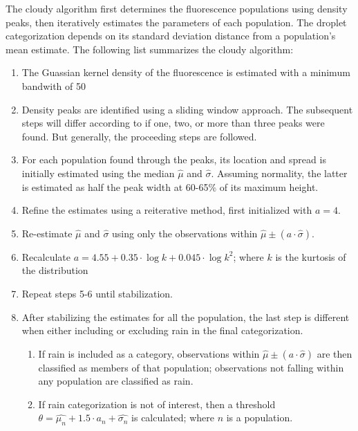 The cloudy algorithm first determines the fluorescence populations using density peaks, then iteratively estimates the parameters of each population. The droplet categorization depends on its standard deviation distance from a population's mean estimate. The following list summarizes the cloudy algorithm:
\begin{enumerate}
    \item The Guassian kernel density of the fluorescence is estimated with a minimum bandwith of 50
    \item Density peaks are identified using a sliding window approach. The subsequent steps will differ according to if one, two, or more than three peaks were found.  But generally, the proceeding steps are followed.
    \item For each population found through the peaks, its location and spread is initially estimated using the median \(\hat{\mu}\) and \(\hat{\sigma}\). Assuming normality, the latter is estimated as half the peak width at 60-65\% of its maximum height.
    \item Refine the estimates using a reiterative method, first initialized with \(a=4\).
    \item Re-estimate \(\hat{\mu}\) and \(\hat{\sigma}\) using only the observations within \(\hat{\mu} \pm (a \cdot \hat{\sigma})\).
    \item Recalculate \(a=4.55 + 0.35 \cdot \log{k} + 0.045 \cdot \log{k}^2\); where \(k\) is the kurtosis of the distribution
    \item Repeat steps 5-6 until stabilization.
    \item After stabilizing the estimates for all the population, the last step is different when either including or excluding rain in the final categorization. 
    \begin{enumerate}
        \item If rain is included as a category, observations within \(\hat{\mu} \pm (a \cdot \hat{\sigma})\) are then classified as members of that population; observations not falling within any population are classified as rain.
        \item If rain categorization is not of interest, then a threshold \(\theta=\hat{\mu_n} + 1.5 \cdot a_n + \hat{\sigma_n}\) is calculated; where \(n\) is a population.  
    \end{enumerate}

\end{enumerate}

